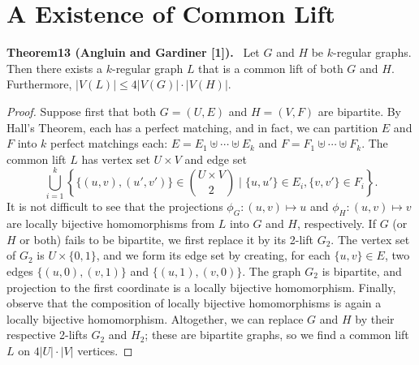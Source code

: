 \documentclass[10pt,a4paper]{article}
\newenvironment{authorclaim}[1]{\par\medskip\noindent\textbf{#1.}\ \ignorespaces}{\par\medskip}
\begin{document}
\section*{A Existence of Common Lift}
\begin{authorclaim}{Theorem13 (Angluin and Gardiner [1])}
Let $G$ and $H$ be $k$-regular graphs. Then there exists a $k$-regular graph $L$ that is a common lift of both $G$ and $H$. Furthermore, $|V(L)|\le4|V(G)|\cdot|V(H)|$.
\end{authorclaim}
\begin{proof}
Suppose first that both $G=(U,E)$ and $H=(V,F)$ are bipartite. By Hall's Theorem, each has a perfect matching, and in fact, we can partition $E$ and $F$ into $k$ perfect matchings each: $E=E_1\uplus\cdots\uplus E_k$ and $F=F_1\uplus\cdots\uplus F_k$. The common lift $L$ has vertex set $U\times V$ and edge set
\[
\bigcup_{i=1}^k\left\{\{(u,v),(u',v')\}\in\binom{U\times V}{2}\mid\{u,u'\}\in E_i,\{v,v'\}\in F_i\right\}.
\]
It is not difficult to see that the projections $\phi_G:(u,v)\mapsto u$ and $\phi_H:(u,v)\mapsto v$ are locally bijective homomorphisms from $L$ into $G$ and $H$, respectively.
If $G$ (or $H$ or both) fails to be bipartite, we first replace it by its 2-lift $G_2$. The vertex set of $G_2$ is $U\times\{0,1\}$, and we form its edge set by creating, for each $\{u,v\}\in E$, two edges $\{(u,0),(v,1)\}$ and $\{(u,1),(v,0)\}$. The graph $G_2$ is bipartite, and projection to the first coordinate is a locally bijective homomorphism. Finally, observe that the composition of locally bijective homomorphisms is again a locally bijective homomorphism. Altogether, we can replace $G$ and $H$ by their respective 2-lifts $G_2$ and $H_2$; these are bipartite graphs, so we find a common lift $L$ on $4|U|\cdot|V|$ vertices.
\end{proof}
\end{document}
